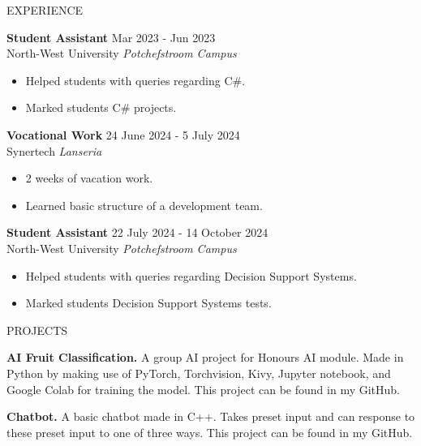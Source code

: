\documentclass{resume} %
\begin{document}
\begin{rSection}{EXPERIENCE}

\textbf{Student Assistant} \hfill Mar 2023 - Jun 2023\\
North-West University \hfill \textit{Potchefstroom Campus}
\begin{itemize}
    \itemsep -3pt {} 
    \item Helped students with queries regarding C\#.
    \item Marked students C\# projects. 
\end{itemize}

\textbf{Vocational Work} \hfill 24 June 2024 - 5 July 2024\\
Synertech \hfill \textit{Lanseria}
\begin{itemize}
    \itemsep -3pt {} 
    \item 2 weeks of vacation work.
    \item Learned basic structure of a development team.
\end{itemize}

\textbf{Student Assistant} \hfill 22 July 2024 - 14 October 2024\\
North-West University \hfill \textit{Potchefstroom Campus}
\begin{itemize}
    \itemsep -3pt {} 
    \item Helped students with queries regarding Decision Support Systems.
    \item Marked students Decision Support Systems tests. 
\end{itemize}

\end{rSection} 


\begin{rSection}{PROJECTS}
\vspace{-1.25em}
\item \textbf{AI Fruit Classification.} {A group AI project for Honours AI module. Made in Python by making use of PyTorch, Torchvision, Kivy, Jupyter notebook, and Google Colab for training the model. This project can be found in my GitHub.}
\item \textbf{Chatbot.} {A basic chatbot made in C++. Takes preset input and can response to these preset input to one of three ways. This project can be found in my GitHub.}
\end{rSection} 
\end{document}
